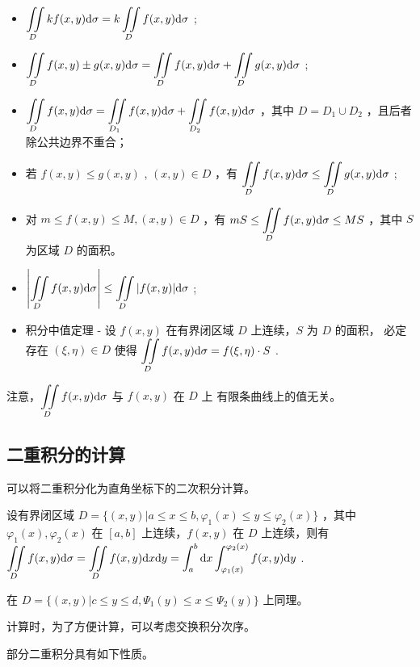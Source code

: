 \begin{itemize}
    \item $ \displaystyle \iint\limits_{D}kf(x,y)\mathrm{d}\sigma = k \iint\limits_{D}f(x,y)\mathrm{d}\sigma $ ;
    \item $ \displaystyle \iint\limits_{D}f(x,y)\pm g(x,y)\mathrm{d}\sigma 
     = \iint\limits_{D}f(x,y)\mathrm{d}\sigma + \iint\limits_{D}g(x,y)\mathrm{d}\sigma$ ;
    \item $ \displaystyle \iint\limits_{D}f(x,y)\mathrm{d}\sigma = \iint\limits_{D_1}f(x,y)\mathrm{d}\sigma
    + \iint\limits_{D_2}f(x,y)\mathrm{d}\sigma $ ，其中 $ D = D_1\cup D_2 $ ，且后者
    除公共边界不重合；
    \item 若 $ f(x,y)\leq g(x,y) $ , $ (x,y)\in D $ ，有 $ \displaystyle \iint\limits_{D}f(x,y)\mathrm{d}\sigma
    \leq \iint\limits_{D}g(x,y)\mathrm{d}\sigma $ ;
    \item 对 $ m\leq f(x,y)\leq M,(x,y)\in D $ ，有 $ \displaystyle mS \leq \iint\limits_{D}f(x,y)\mathrm{d}\sigma
    \leq MS $ ，其中 $ S $ 为区域 $ D $ 的面积。
    \item $ \displaystyle \left|\iint\limits_{D}f(x,y)\mathrm{d}\sigma\right| \leq \iint\limits_{D}|f(x,y)|\mathrm{d}\sigma $ ;
    \item 积分中值定理 - 设 $ f(x,y) $ 在有界闭区域 $ D $ 上连续，$ S $ 为 $ D $ 的面积，
    必定存在 $ (\xi,\eta)\in D $ 使得 $ \displaystyle \iint\limits_{D}f(x,y)\mathrm{d}\sigma = f(\xi,\eta)\cdot S $ .
\end{itemize}

注意，$ \displaystyle \iint\limits_{D}f(x,y)\mathrm{d}\sigma $ 与 $ f(x,y) $ 在 $ D $ 上
有限条曲线上的值无关。

\subsection{二重积分的计算}

可以将二重积分化为直角坐标下的二次积分计算。

设有界闭区域 $ D = \{(x,y)|a\leq x\leq b,\varphi_1(x)\leq y\leq \varphi_2(x)\} $ ，其中
$ \varphi_1(x),\varphi_2(x) $ 在 $ [a,b] $ 上连续，$ f(x,y) $ 在 $ D $ 上连续，则有
$ \displaystyle \iint\limits_{D}f(x,y)\mathrm{d}\sigma = \iint\limits_{D}f(x,y)\mathrm{d}x\mathrm{d}y
 = \int_a^b\mathrm{d}x\int_{\varphi_1(x)}^{\varphi_2(x)}f(x,y)\mathrm{d}y $ .

在 $ D = \{(x,y)|c\leq y\leq d,\varPsi_1(y)\leq x\leq \varPsi_2(y)\} $ 上同理。

计算时，为了方便计算，可以考虑交换积分次序。

部分二重积分具有如下性质。

